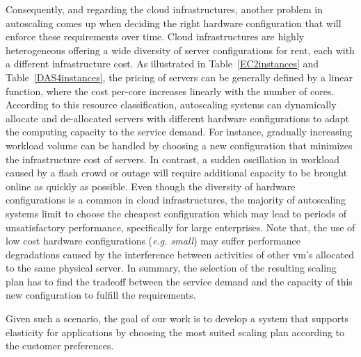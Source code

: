 Consequently, and regarding the cloud infrastructures, another problem in autoscaling comes up when deciding the right hardware configuration that will enforce these requirements over time. Cloud infrastructures are highly heterogeneous offering a wide diversity of server configurations for rent, each with a different infrastructure cost. As illustrated in Table~\ref{EC2instances} and Table~\ref{DAS4instances}, the pricing of servers can be generally defined by a linear function, where the cost per-core increases linearly with the number of cores. According to this resource classification, autoscaling systems can dynamically allocate and de-allocated servers with different hardware configurations to adapt the computing capacity to the service demand. For instance, gradually increasing workload volume can be handled by choosing a new configuration that minimizes the infrastructure cost of servers. In contrast, a sudden oscillation in workload caused by a flash crowd or outage will require additional capacity to be brought online as quickly as possible. Even though the diversity of hardware configurations is a common in cloud infrastructures, the majority of autoscaling systems limit to choose the cheapest configuration which may lead to periods of unsatisfactory performance, specifically for large enterprises. Note that, the use of low cost hardware configurations (\emph{e.g. small}) may suffer performance degradations caused by the interference between activities of other vm's allocated to the same physical server. In summary, the selection of the resulting scaling plan has to find the tradeoff between the service demand and the capacity of this new configuration to fulfill the requirements.

Given such a scenario, the goal of our work is to develop a system that supports elasticity for applications by choosing the most suited scaling plan according to the customer preferences.














